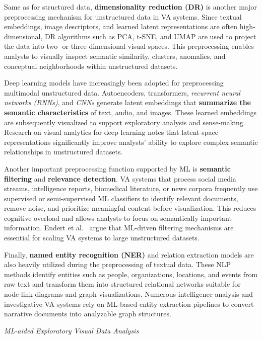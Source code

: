\documentclass{sfuthesis}
\begin{document}
Same as for structured data, \textbf{dimensionality reduction (DR)} is another major preprocessing mechanism for unstructured data in VA systems. Since textual embeddings, image descriptors, and learned latent representations are often high-dimensional, DR algorithms such as PCA, t-SNE, and UMAP are used to project the data into two- or three-dimensional visual spaces. This preprocessing enables analysts to visually inspect semantic similarity, clusters, anomalies, and conceptual neighborhoods within unstructured datasets.\par
Deep learning models have increasingly been adopted for preprocessing multimodal unstructured data. Autoencoders, transformers, \textit{recurrent neural networks (RNNs)}, and \textit{CNNs} generate latent embeddings that \textbf{summarize the semantic characteristics} of text, audio, and images. These learned embeddings are subsequently visualized to support exploratory analysis and sense-making. Research on visual analytics for deep learning notes that latent-space representations significantly improve analysts’ ability to explore complex semantic relationships in unstructured datasets.\par
Another important preprocessing function supported by ML is \textbf{semantic filtering} and \textbf{relevance detection}. VA systems that process social media streams, intelligence reports, biomedical literature, or news corpora frequently use supervised or semi-supervised ML classifiers to identify relevant documents, remove noise, and prioritize meaningful content before visualization. This reduces cognitive overload and allows analysts to focus on semantically important information. Endert et al.~\cite{endert_state_2017} argue that ML-driven filtering mechanisms are essential for scaling VA systems to large unstructured datasets.\par
Finally, \textbf{named entity recognition (NER)} and relation extraction models are also heavily utilized during the preprocessing of textual data. These NLP methods identify entities such as people, organizations, locations, and events from raw text and transform them into structured relational networks suitable for node-link diagrams and graph visualizations. Numerous intelligence-analysis and investigative VA systems rely on ML-based entity extraction pipelines to convert narrative documents into analyzable graph structures.\par
\noindent\textit{ML-aided Exploratory Visual Data Analysis}\par
\end{document}
